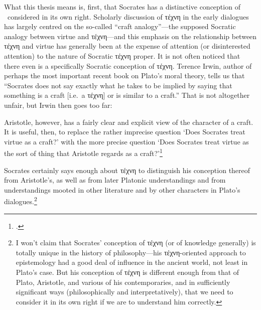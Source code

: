 \documentclass[11pt,letterpaper,oneside]{amsart} %
\begin{document}
What this thesis means is, first, that Socrates has a distinctive conception of \techne\ considered in its own right. Scholarly discussion of τέχνη in the early dialogues has largely centred on the so-called ``craft analogy''---the supposed Socratic analogy between virtue and τέχνη---and this emphasis on the relationship between τέχνη and virtue has generally been at the expense of attention (or disinterested attention) to the nature of Socratic τέχνη proper. It is not often noticed that there even is a specifically Socratic conception of τέχνη. Terence Irwin, author of perhaps the most important recent book on  Plato's moral theory, tells us that ``Socrates does not say exactly what  he takes to be implied by saying that something is a craft [i.e.\ a τέχνη] or is similar to a craft.'' That is not altogether unfair, but Irwin then goes too far:\begin{squote}Aristotle, however, has a fairly clear and explicit view of the character of a  craft. It is useful, then, to replace the rather imprecise question `Does Socrates treat virtue as a craft?' with the more precise question `Does Socrates treat virtue as the sort of thing that Aristotle regards as a craft?'\footnote{\citet[70]{irwin1995pse}.}\end{squote} Socrates certainly says enough about τέχνη to  distinguish his conception thereof from Aristotle's, as well as from  later Platonic understandings and from understandings mooted in other literature and by other characters in Plato's dialogues.\footnote{I won't claim that Socrates' conception of τέχνη (or of knowledge generally) is totally unique in the history of philosophy---his τέχνη-oriented approach to epistemology had a good deal of influence in the ancient world, not least in Plato's case. But his conception of τέχνη is different enough from that of Plato, Aristotle, and various of his contemporaries, and in sufficiently significant ways (philosophically and interpretatively), that we need to consider it in its own right if we are to understand him correctly.} %





\end{document}
